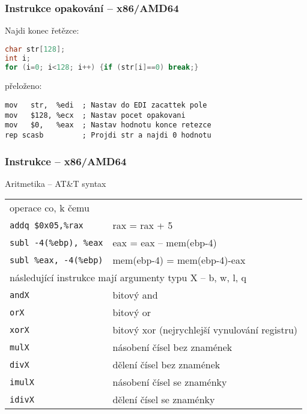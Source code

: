 \documentclass{beamer}
\begin{document}
\begin{frame}[fragile]
\frametitle{Instrukce opakování – x86/AMD64}

Najdi konec řetězce:
\begin{lstlisting}[language={C},columns=flexible]
char str[128];
int i;
for (i=0; i<128; i++) {if (str[i]==0) break;}
\end{lstlisting}
přeloženo:
\begin{lstlisting}[language={[x86masm]Assembler},columns=flexible]
mov   str,  %edi  ; Nastav do EDI zacattek pole
mov   $128, %ecx  ; Nastav pocet opakovani
mov   $0,   %eax  ; Nastav hodnotu konce retezce
rep scasb         ; Projdi str a najdi 0 hodnotu
\end{lstlisting}

\end{frame}



\begin{frame}
\frametitle{Instrukce – x86/AMD64}
Aritmetika -- AT\&T syntax
\begin{tabular}{ l l}
operace co, k čemu &\\
\texttt{addq    \$0x05,\%rax} & rax = rax + 5\\
\texttt{subl    -4(\%ebp), \%eax} &  eax = eax -- mem(ebp-4)\\
\texttt{subl    \%eax, -4(\%ebp)} & mem(ebp-4) = mem(ebp-4)-eax\\
\multicolumn{2}{l}{následující instrukce mají argumenty typu X -- b, w, l, q}\\
\texttt{andX} & bitový and\\
\texttt{orX} & bitový or\\
\texttt{xorX} & bitový xor (nejrychlejší vynulování registru)\\
\texttt{mulX} & násobení čísel bez znamének\\
\texttt{divX} & dělení čísel bez znamének\\
\texttt{imulX} & násobení čísel se znaménky\\
\texttt{idivX} & dělení čísel se znaménky\\
\end{tabular}
\end{frame}
\end{document}

